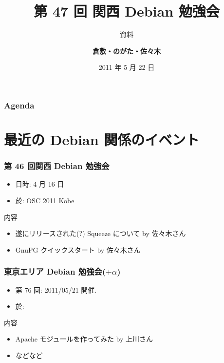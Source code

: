 \documentclass[cjk,dvipdfmx,12pt,%
hyperref={bookmarks=true,bookmarksnumbered=true,bookmarksopen=false,%
colorlinks=false,%
pdftitle={第 47 回 関西 Debian 勉強会},%
pdfauthor={倉敷・のがた・佐々木},%
pdfsubject={資料},%
}]{beamer}
\title{第 47 回 関西 Debian 勉強会}
\subtitle{{\scriptsize 資料}}
\author[倉敷 悟]{{\large\bf 倉敷・のがた・佐々木}}
\institute[Debian JP]{{\normalsize\tt 関西 Debian 勉強会}}
\date{{\small 2011 年 5 月 22 日}}
\begin{document}
\settitleslide
\begin{frame}
\titlepage
\end{frame}
\setdefaultslide

\begin{frame}[fragile]
\frametitle{Agenda}
\tableofcontents
\end{frame}

\section{最近の Debian 関係のイベント}


\begin{frame}[fragile]
\frametitle{第 46 回関西 Debian 勉強会}

\begin{itemize}
\item 日時: 4 月 16 日
\item 於: OSC 2011 Kobe
\end{itemize}

\begin{block}{内容}
  \begin{itemize}
  \item 遂にリリースされた(?) Squeeze について by 佐々木さん
  \item GnuPG クイックスタート by 佐々木さん
  \end{itemize}
\end{block}
\end{frame}

\begin{frame}[fragile]
  \frametitle{東京エリア Debian 勉強会($+\alpha$)}
  \begin{itemize}
  \item 第 76 回: 2011/05/21 開催.
  \item 於:
  \end{itemize}
  \begin{block}{内容}
    \begin{itemize}
    \item Apache モジュールを作ってみた by 上川さん
    \item などなど
    \end{itemize}
  \end{block}
\end{frame}

\end{document}
